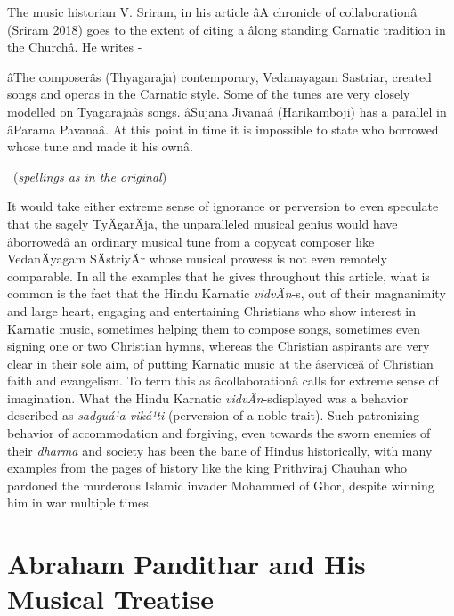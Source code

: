 The music historian V. Sriram, in his article âA chronicle of collaborationâ (Sriram 2018) goes to the extent of citing a âlong standing Carnatic tradition in the Churchâ. He writes -

\begin{myquote}
âThe composerâs (Thyagaraja) contemporary, Vedanayagam Sastriar, created songs and operas in the Carnatic style. Some of the tunes are very closely modelled on Tyagarajaâs songs. âSujana Jivanaâ (Harikamboji) has a parallel in âParama Pavanaâ. At this point in time it is impossible to state who borrowed whose tune and made it his ownâ. 

~\hfill (\textit{spellings as in the original})
\end{myquote}

It would take either extreme sense of ignorance or perversion to even speculate that the sagely TyÄgarÄja, the unparalleled musical genius would have âborrowedâ an ordinary musical tune from a copycat composer like VedanÄyagam SÄstriyÄr whose musical prowess is not even remotely comparable. In all the examples that he gives throughout this article, what is common is the fact that the Hindu Karnatic \textit{vidvÄn}-s, out of their magnanimity and large heart, engaging and entertaining Christians who show interest in Karnatic music, sometimes helping them to compose songs, sometimes even signing one or two Christian hymns, whereas the Christian aspirants are very clear in their sole aim, of putting Karnatic music at the âserviceâ of Christian faith and evangelism. To term this as âcollaborationâ calls for extreme sense of imagination. What the Hindu Karnatic \textit{vidvÄn}-s\break displayed was a behavior described as \textit{sadguá¹a viká¹ti} (perversion of a noble trait). Such patronizing behavior of accommodation and forgiving, even towards the sworn enemies of their \textit{dharma} and society has been the bane of Hindus historically, with many examples from the pages of history like the king Prithviraj Chauhan who pardoned the murderous Islamic invader Mohammed of Ghor, despite winning him in war multiple times.

\vspace{-.2cm}

\section*{Abraham Pandithar and His Musical Treatise}

